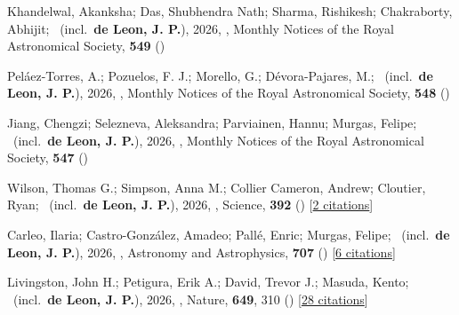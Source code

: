 \item[{\color{numcolor}\scriptsize92}] Khandelwal, Akanksha; Das, Shubhendra Nath; Sharma, Rishikesh; Chakraborty, Abhijit; \etal\ (incl.\ \textbf{de Leon, J. P.}), 2026, , Monthly Notices of the Royal Astronomical Society, \textbf{549} ()

\item[{\color{numcolor}\scriptsize91}] Pel{\'a}ez-Torres, A.; Pozuelos, F. J.; Morello, G.; D{\'e}vora-Pajares, M.; \etal\ (incl.\ \textbf{de Leon, J. P.}), 2026, , Monthly Notices of the Royal Astronomical Society, \textbf{548} ()

\item[{\color{numcolor}\scriptsize90}] Jiang, Chengzi; Selezneva, Aleksandra; Parviainen, Hannu; Murgas, Felipe; \etal\ (incl.\ \textbf{de Leon, J. P.}), 2026, , Monthly Notices of the Royal Astronomical Society, \textbf{547} ()

\item[{\color{numcolor}\scriptsize89}] Wilson, Thomas G.; Simpson, Anna M.; Collier Cameron, Andrew; Cloutier, Ryan; \etal\ (incl.\ \textbf{de Leon, J. P.}), 2026, , Science, \textbf{392} () [\href{https://ui.adsabs.harvard.edu/abs/2026Sci...392..271W}{2 citations}]

\item[{\color{numcolor}\scriptsize88}] Carleo, Ilaria; Castro-Gonz{\'a}lez, Amadeo; Pall{\'e}, Enric; Murgas, Felipe; \etal\ (incl.\ \textbf{de Leon, J. P.}), 2026, , Astronomy and Astrophysics, \textbf{707} () [\href{https://ui.adsabs.harvard.edu/abs/2026A&A...707A...4C}{6 citations}]

\item[{\color{numcolor}\scriptsize87}] Livingston, John H.; Petigura, Erik A.; David, Trevor J.; Masuda, Kento; \etal\ (incl.\ \textbf{de Leon, J. P.}), 2026, , Nature, \textbf{649}, 310 () [\href{https://ui.adsabs.harvard.edu/abs/2026Natur.649..310L}{28 citations}]

